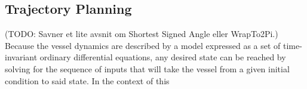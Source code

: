 \subsection{Trajectory Planning}
(TODO: Savner et lite avsnit om Shortest Signed Angle eller WrapTo2Pi.)
Because the vessel dynamics are described by a model expressed as a set of time-invariant ordinary differential equations, any desired state
can be reached by solving for the sequence of inputs that will take the vessel from a given initial condition to said state. In the context of this
